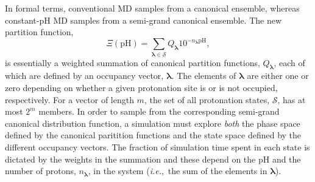 In formal terms, conventional MD samples from a canonical ensemble, whereas
  constant-pH MD samples from a semi-grand canonical ensemble.
The new partition function,
\begin{equation}\label{eqn:semigrand}
  \Xi(\text{pH})
  =
  \sum_{\text{$\bm \lambda$} \in \mathcal{S}}
    Q_{\text{$\bm \lambda$}}
    10^{-n_{\text{$\bm \lambda$}} \text{pH}},
\end{equation}
  is essentially a weighted summation of canonical partition functions,
  $Q_{\text{$\bm \lambda$}}$, each of which are defined by an occupancy vector,
  ${\bm \lambda}$.
The elements of ${\bm \lambda}$ are either one or zero depending on whether a
  given protonation site is or is not occupied, respectively.
For a vector of length $m$, the set of all protonation states, $\mathcal{S}$,
  has at most $2^m$ members.
In order to sample from the corresponding semi-grand canonical distribution
  function, a simulation must explore \emph{both} the phase space defined by
  the canonical paritition functions and the state space defined by the
  different occupancy vectors.
The fraction of simulation time spent in each state is dictated by the weights
  in the summation and these depend on the pH and the number of protons,
  $n_{\text{$\bm \lambda$}}$, in the system (\textit{i.e.},~the sum of the
  elements in ${\bm \lambda}$).

